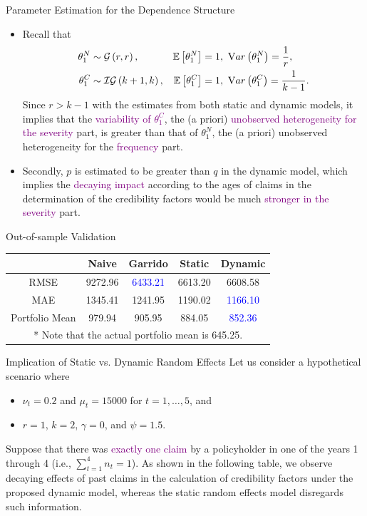 \documentclass[ignorenonframetext,]{beamer}
\begin{document}
\begin{frame}{Parameter Estimation for the Dependence Structure}
\begin{itemize}
\item Recall that
\begin{align*}
\theta^N_1 &\sim \mathcal{G}\left(r,r\right), & {\mathbb E}\left[\theta^N_1\right] &= 1,\ {\mathrm Var}\left(\theta^N_1\right) = \frac{1}{r}, \\
\theta^C_1 &\sim \mathcal{IG}\left(k+1,k\right), & {\mathbb E}\left[\theta^C_1\right] &= 1,\ {\mathrm Var}\left(\theta^C_1\right) = \frac{1}{k-1}.
\end{align*}
Since $r > k-1$ with the estimates from both static and dynamic models, it implies that the
\textcolor{purple}{variability of $\theta^C_1$}, the (a priori) \textcolor{purple}{unobserved heterogeneity for the severity} part,
is greater than that of $\theta^N_1$, the (a priori) unobserved heterogeneity for the \textcolor{purple}{frequency} part.
\item Secondly, $p$ is estimated to be greater than $q$ in the dynamic model, which implies the
\textcolor{purple}{decaying impact} according to the ages of claims in the determination of the credibility factors would be much
\textcolor{purple}{stronger in the severity} part.
\end{itemize}
\end{frame}

\begin{frame}{Out-of-sample Validation}
\centering
\small
\begin{tabular}{c|cccc}
\hline\hline
 & Naive & Garrido & Static & Dynamic \\
\hline
RMSE & 9272.96 & \textcolor{blue}{6433.21} & 6613.20 & 6608.58 \\
MAE & 1345.41 & 1241.95 & 1190.02 & \textcolor{blue}{1166.10} \\
Portfolio Mean & 979.94 & 905.95 & 884.05 & \textcolor{blue}{852.36} \\
\hline\hline
\multicolumn{5}{c}{* Note that the actual portfolio mean is 645.25.}
\end{tabular}
\end{frame}

\begin{frame}{Implication of Static vs. Dynamic Random Effects}
Let us consider a hypothetical scenario where
\begin{itemize}
\item $\nu_t = 0.2$ and $\mu_t = 15000$ for $t=1,\ldots,5$, and
\item $r=1$, $k=2$, $\gamma=0$, and $\psi=1.5$.
\end{itemize}
Suppose that there was \textcolor{purple}{exactly one claim} by a policyholder in one of the years 1 through 4
(i.e., $\sum_{t=1}^4 n_t = 1$). As shown in the following table, we observe decaying effects of past claims in the
calculation of credibility factors under the proposed dynamic model, whereas the static random effects model disregards such information.
\end{frame}
\end{document}
